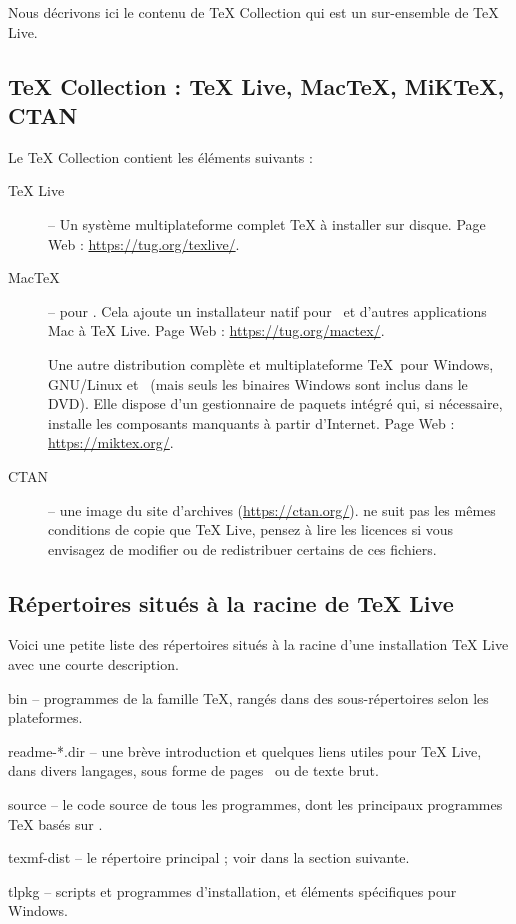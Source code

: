 \documentclass[german, english, french, 12pt]{article}
\renewcommand{\TL}{\TeX{} Live\xspace}%
\renewcommand{\TK}{\TeX{} Collection\xspace}%
\begin{document}
Nous décrivons ici le contenu de \TK{} qui est un sur-ensemble de \TL.

\subsection {\protect\TK{} : \protect\TL, Mac\protect\TeX, MiK\protect\TeX,
  CTAN}
\label{sec:tl-coll-dists}

Le \DVD{} \TK{} contient les éléments suivants :

\begin{description}

\item[\TL{}] -- Un système multiplateforme complet \TeX{} à installer sur
  disque. Page Web : \url{https://tug.org/texlive/}.

\item[Mac\TeX] -- pour \macOS. Cela ajoute un installateur natif pour \macOS\ et
  d'autres applications Mac à \TL{}.  Page Web : \url{https://tug.org/mactex/}.

\item [\MIKTEX] Une autre distribution complète et multiplateforme \TeX\ pour
  Windows, GNU/Linux et \macOS\ (mais seuls les binaires Windows sont inclus
  dans le DVD). Elle dispose d'un gestionnaire de paquets intégré qui, si
  nécessaire, installe les composants manquants à partir d'Internet. Page
  Web : \url{https://miktex.org/}.

\item[CTAN] -- une image du site d'archives \CTAN{} (\url{https://ctan.org/}).
  \CTAN{} ne suit pas les mêmes conditions de copie que \TL{}, pensez à lire les
  licences si vous envisagez de modifier ou de redistribuer certains de ces
  fichiers.

\end{description}

\subsection{Répertoires situés à la racine de \protect\TL{}}
\label{sec:tld}

Voici une petite liste des répertoires situés à la racine d'une installation \TL
avec une courte description.

\begin{ttdescription}
\item[bin] -- programmes de la famille \TeX{}, rangés dans des sous-répertoires
  selon les plateformes.
%
\item[readme-*.dir] -- une brève introduction et quelques liens utiles pour \TL,
  dans divers langages, sous forme de pages \HTML\ ou de texte brut.
%
\item[source] -- le code source de tous les programmes, dont les principaux
  programmes \TeX{} basés sur \Webc{}.
%
\item[texmf-dist] -- le répertoire principal ; voir  dans la
  section suivante.
%
\item[tlpkg] -- scripts et programmes d'installation, et éléments spécifiques
  pour Windows.
\end{ttdescription}
\end{document}
